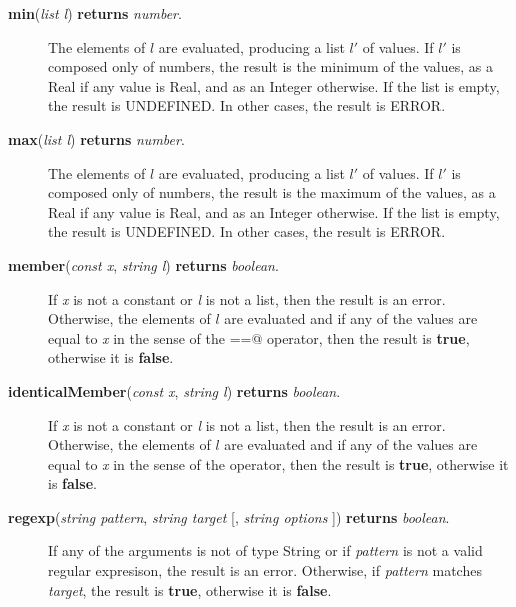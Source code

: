 \documentclass{article}
\begin{document}
\begin{description}
\item[\textbf{min}(\emph{list l}) \textbf{returns} \emph{number}.]  
The elements of $l$ are evaluated, producing a list $l'$ of values.
If $l'$ is composed only of numbers, the result is the minimum of the values,
as a Real if any value is Real, and as an Integer otherwise.
If the list is empty, the result is UNDEFINED. In other cases, the result is
ERROR.

\item[\textbf{max}(\emph{list l}) \textbf{returns} \emph{number}.]  
The elements of $l$ are evaluated, producing a list $l'$ of values.
If $l'$ is composed only of numbers, the result is the maximum of the values,
as a Real if any value is Real, and as an Integer otherwise.
If the list is empty, the result is UNDEFINED. In other cases, the result is
ERROR.

\item[\textbf{member}(\emph{const x}, \emph{string l})
\textbf{returns} \emph{boolean}.]

If \emph{x} is not a constant or \emph{l} is not a list, then the
result is an error.  Otherwise, the elements of $l$ are evaluated and if any of
the values are equal to \emph{x} in the sense of the \verb@==@ operator, then
the result is \textbf{true}, otherwise it is \textbf{false}.

\item[\textbf{identicalMember}(\emph{const x}, \emph{string l})
\textbf{returns} \emph{boolean}.]

If \emph{x} is not a constant or \emph{l} is not a list, then the
result is an error.  Otherwise, the elements of $l$ are evaluated and if any of
the values are equal to \emph{x} in the sense of the \verb@is@ operator, then
the result is \textbf{true}, otherwise it is \textbf{false}.

\item[\textbf{regexp}(\emph{string pattern}, \emph{string target}
{[}, \emph{string options} {]}) \textbf{returns} \emph{boolean}.]

If any of the arguments is not of type String or if \emph{pattern} is not a
valid regular expresison, the result is an error.  Otherwise, if \emph{pattern}
matches \emph{target}, the result is \textbf{true}, otherwise it is
\textbf{false}.


\end{description}
\end{document}
